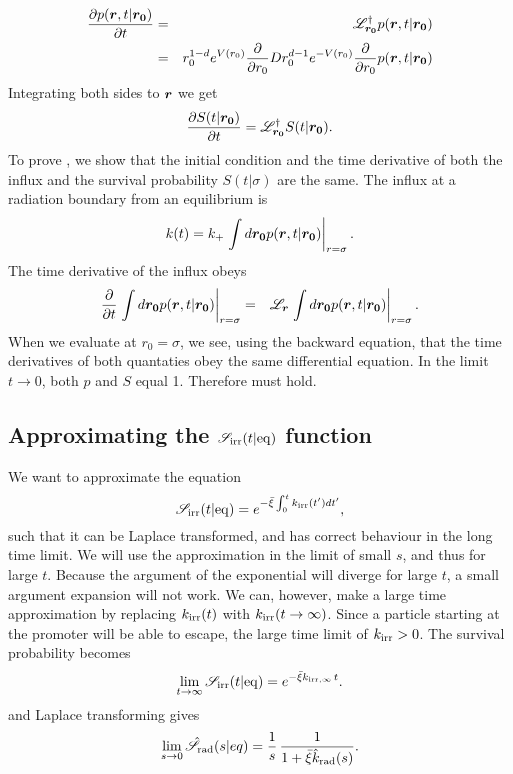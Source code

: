 \begin{eqnarray}
 \pdiff{p(\vect{r},t|\vect{r_0})}{t} & = & \mathscr{L}_{\vect{r_0}}^{\dag} p(\vect{r},t|\vect{r_0}) \\
 & = & r_0^{1-d} e^{V(r_0)} \pdiff{}{r_0} D r_0^{d-1} e^{-V(r_0)} \pdiff{}{r_0} p(\vect{r},t|\vect{r_0})
 \elabel{backward_eqn}
\end{eqnarray}
Integrating both sides to $\boldsymbol{r}$ we get
\begin{equation}
 \pdiff{S(t|\vect{r_0})}{t} = \mathscr{L}_{\vect{r_0}}^{\dag} S(t|\vect{r_0}).
 \elabel{S_eqn}
\end{equation}
To prove , we show that the initial condition and the time derivative of both the influx and the survival probability $S(t|\sigma)$ are the same. The influx at a radiation boundary from an equilibrium is
\begin{equation}
 k(t) = k_+ \left. \int d\boldsymbol{r_0} p(\boldsymbol{r},t|\boldsymbol{r_0}) \right|_{r=\sigma}.
\end{equation}
The time derivative of the influx obeys
\begin{eqnarray}
 \frac{\partial }{\partial t} \left. \int d\boldsymbol{r_0} p(\boldsymbol{r},t|\boldsymbol{r_0}) \right|_{r=\sigma} & = & \mathscr{L}_{\boldsymbol{r}} \left. \int d\boldsymbol{r_0} p(\boldsymbol{r},t|\boldsymbol{r_0}) \right|_{r=\sigma}.
\end{eqnarray}
When we evaluate  at $r_0=\sigma$, we see, using the backward equation, that the time derivatives of both quantaties obey the same differential equation. In the limit $t \rightarrow 0$, both $p$ and $S$ equal 1. Therefore  must hold.


\subsection{ Approximating the $\mathscr{S}_{\rm irr}(t|{\rm eq})$ function}
We want to approximate the equation
\begin{equation}
 \mathscr{S}_{\rm irr}(t|{\rm eq}) = e^{-\bar{\xi}\int_0^t k_{{\rm irr}}(t') dt'},
\end{equation}
such that it can be Laplace transformed, and has correct behaviour in the long time limit. We will use the approximation in the limit of small $s$, and thus for large $t$. Because the argument of the exponential will diverge for large $t$, a small argument expansion will not work. We can, however, make a large time approximation by replacing $k_{{\rm irr}}(t)$ with $k_{{\rm irr}}(t \rightarrow \infty)$. Since a particle starting at the promoter will be able to escape, the large time limit of $k_{{\rm irr}}>0$. The survival probability becomes  
\begin{equation}
 \lim_{t \rightarrow \infty} \mathscr{S}_{\rm irr}(t|{\rm eq}) = e^{-\bar{\xi} k_{{\rm irr},\infty}\,t}.
\end{equation}
and Laplace transforming gives
\begin{equation}
 \lim_{s \rightarrow 0} \hat{\mathscr{S}}_{\rm rad}(s|eq) = \frac{1}{s} \, \frac{1}{1 + \bar{\xi} \hat{k}_{\rm rad}(s)}.
\end{equation}


